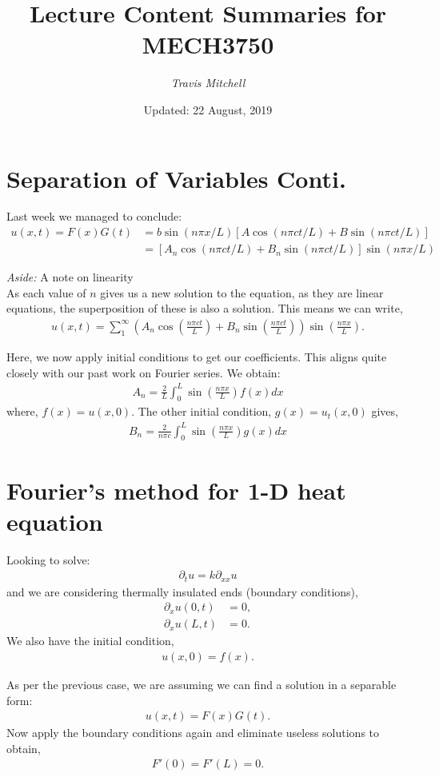 \documentclass[11pt,a4paper]{report}
\author{\textit{Travis Mitchell}}
\title{Lecture Content Summaries for MECH3750}
\date{Updated: 22 August, 2019}
\theoremstyle{definition}
\begin{document}
\section{Separation of Variables Conti.}
Last week we managed to conclude:
\begin{align*}
 u(x,t) = F(x)G(t) &= b\sin(n\pi x/L) [A \cos(n\pi c t/L) + B \sin(n\pi ct/L)] \\
 				   &= [A_n \cos(n\pi c t/L) + B_n \sin(n\pi ct/L)] \sin(n\pi x/L)
\end{align*}

\textit{Aside:} A note on linearity \\
As each value of $n$ gives us a new solution to the equation, as they are linear equations, the superposition of these is also a solution. This means we can write,
\begin{align*}
	u(x,t) = \sum_1^{\infty} \left(A_n \cos \left(\frac{n\pi c t}{L}\right) + B_n \sin \left(\frac{n\pi c t}{L}\right)\right) \sin \left(\frac{n\pi x}{L}\right).
\end{align*}

Here, we now apply initial conditions to get our coefficients. This aligns quite closely with our past work on Fourier series. We obtain:
\begin{align*}
	A_n= \frac{2}{L} \int_0^L \sin \left(\frac{n\pi x}{L}\right) f(x) dx
\end{align*}
where, $f(x)= u(x,0)$. The other initial condition, $g(x) = u_t(x,0)$ gives,
\begin{align*}
	B_n = \frac{2}{n\pi c} \int_0^L \sin \left(\frac{n\pi x}{L}\right) g(x) dx
\end{align*} 


\section{Fourier's method for 1-D heat equation}
Looking to solve:
\begin{align*}
	\partial_t u = k \partial_{xx} u
\end{align*}
and we are considering thermally insulated ends (boundary conditions),
\begin{align*}
	\partial_x u(0,t) &= 0, \\
	\partial_x u(L,t) &= 0.
\end{align*}
We also have the initial condition,
\begin{align*}
	u(x,0) = f(x).
\end{align*}

As per the previous case, we are assuming we can find a solution in a separable form:
\begin{align*}
	u(x,t) = F(x) G(t).
\end{align*}
Now apply the boundary conditions again and eliminate useless solutions to obtain,
\begin{align*}
	 F'(0) = F'(L) = 0.
\end{align*}
\end{document}
